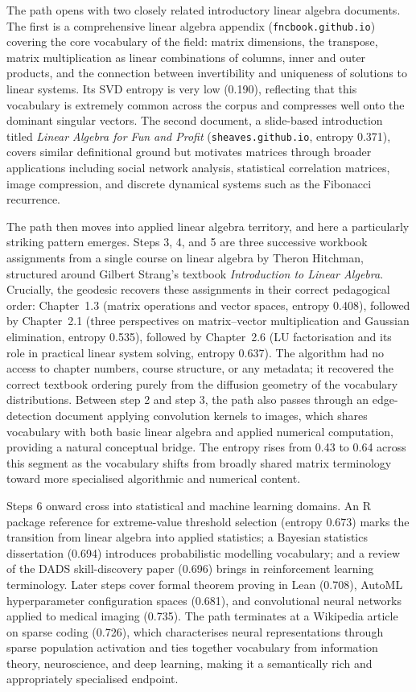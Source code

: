 \documentclass[12pt,a4paper]{article}
\begin{document}
The path opens with two closely related introductory linear algebra documents. The first is a comprehensive linear algebra appendix (\texttt{fncbook.github.io}) covering the core vocabulary of the field: matrix dimensions, the transpose, matrix multiplication as linear combinations of columns, inner and outer products, and the connection between invertibility and uniqueness of solutions to linear systems. Its SVD entropy is very low (0.190), reflecting that this vocabulary is extremely common across the corpus and compresses well onto the dominant singular vectors. The second document, a slide-based introduction titled \textit{Linear Algebra for Fun and Profit} (\texttt{sheaves.github.io}, entropy 0.371), covers similar definitional ground but motivates matrices through broader applications including social network analysis, statistical correlation matrices, image compression, and discrete dynamical systems such as the Fibonacci recurrence.

The path then moves into applied linear algebra territory, and here a particularly striking pattern emerges. Steps 3, 4, and 5 are three successive workbook assignments from a single course on linear algebra by Theron Hitchman, structured around Gilbert Strang's textbook \textit{Introduction to Linear Algebra}. Crucially, the geodesic recovers these assignments in their correct pedagogical order: Chapter~1.3 (matrix operations and vector spaces, entropy 0.408), followed by Chapter~2.1 (three perspectives on matrix--vector multiplication and Gaussian elimination, entropy 0.535), followed by Chapter~2.6 (LU factorisation and its role in practical linear system solving, entropy 0.637). The algorithm had no access to chapter numbers, course structure, or any metadata; it recovered the correct textbook ordering purely from the diffusion geometry of the vocabulary distributions. Between step 2 and step 3, the path also passes through an edge-detection document applying convolution kernels to images, which shares vocabulary with both basic linear algebra and applied numerical computation, providing a natural conceptual bridge. The entropy rises from 0.43 to 0.64 across this segment as the vocabulary shifts from broadly shared matrix terminology toward more specialised algorithmic and numerical content.

Steps 6 onward cross into statistical and machine learning domains. An R package reference for extreme-value threshold selection (entropy 0.673) marks the transition from linear algebra into applied statistics; a Bayesian statistics dissertation (0.694) introduces probabilistic modelling vocabulary; and a review of the DADS skill-discovery paper (0.696) brings in reinforcement learning terminology. Later steps cover formal theorem proving in Lean (0.708), AutoML hyperparameter configuration spaces (0.681), and convolutional neural networks applied to medical imaging (0.735). The path terminates at a Wikipedia article on sparse coding (0.726), which characterises neural representations through sparse population activation and ties together vocabulary from information theory, neuroscience, and deep learning, making it a semantically rich and appropriately specialised endpoint.
\end{document}
